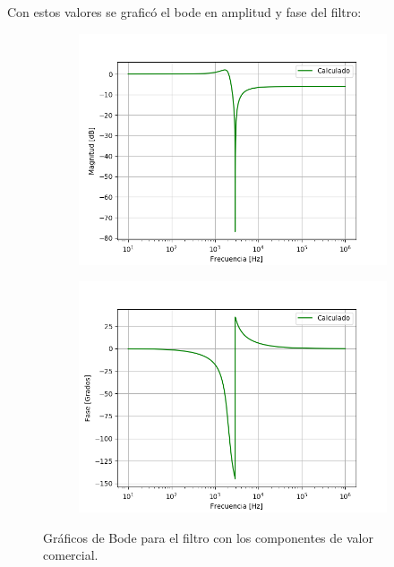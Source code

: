 \documentclass[a4paper]{article}
\begin{document}
Con estos valores se graficó el bode en amplitud y fase del filtro:

\begin{figure}[H]
	\centering
	\begin{subfigure}[t]{0.49\textwidth}
	\hspace*{-2cm}
	\centering
		\includegraphics[width=1.3\textwidth]{Imagenes/bodemag_calc.png}
	\end{subfigure}
	\begin{subfigure}[t]{0.49\textwidth}
	\centering
		\includegraphics[width=1.3\textwidth]{Imagenes/bodefase_calc.png}
	\end{subfigure}
	\label{fig:bode_calc}
	\caption{Gráficos de Bode para el filtro con los componentes de valor comercial.}
\end{figure}
\end{document}
